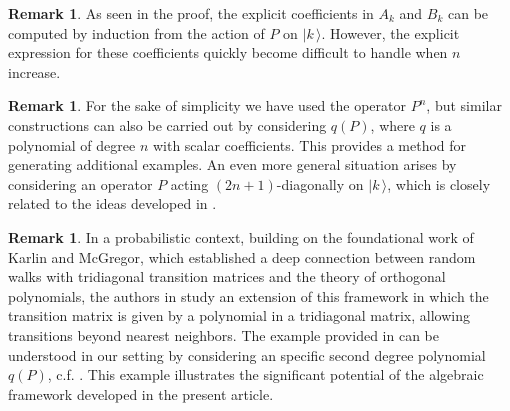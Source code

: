 \documentclass[a4paper,reqno]{amsart}
\theoremstyle{definition}
\newtheorem{remark}[theorem]{Remark}
\numberwithin{equation}{section}
\newcommand{\ket}[1]{\mid{#1}\,\rangle}
\begin{document}
\begin{remark}
    As seen in the proof, the explicit coefficients in $A_k$ and $B_k$ can be computed by induction from the action of $P$ on $\ket{k}$. However, the explicit expression for these coefficients quickly become difficult to handle when $n$ increase. 
\end{remark}
\begin{remark}
For the sake of simplicity we have used the operator $P^n$, but similar constructions can also be carried out by considering $q(P)$, where $q$ is a polynomial of degree $n$ with scalar coefficients. This provides a method for generating additional examples. An even more general situation arises by considering an operator $P$ acting $(2n+1)$-diagonally on $\ket{k}$, which is closely related to the ideas developed in \cite{DuranVanAssche95}. 
\end{remark}
\begin{remark}
In a probabilistic context, building on the foundational work of Karlin and McGregor, which established a deep connection between random walks with tridiagonal transition matrices and the theory of orthogonal polynomials, the authors in \cite{RomanMenchon} study an extension of this framework in which the transition matrix is given by a polynomial in a tridiagonal matrix, allowing transitions beyond nearest neighbors. The example provided in \cite{RomanMenchon} can be understood in our setting by considering an specific second degree polynomial $q(P)$, c.f. \cite[Sec 4.1]{RomanMenchon}. This example illustrates the significant potential of the algebraic framework developed in the present article.
\end{remark}
\end{document}
